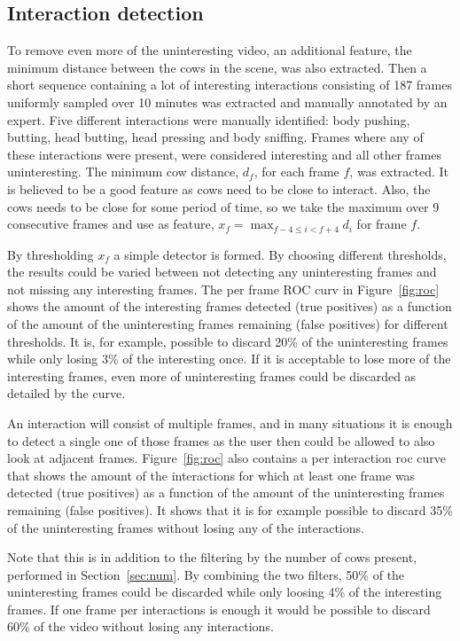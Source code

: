 \documentclass{cta-author}
\begin{document}
\subsection{Interaction detection}
To remove even more of the uninteresting video, an additional feature, the minimum distance between the cows
in the scene, was also extracted. Then a short sequence containing a lot of interesting interactions
consisting of 187 frames uniformly sampled over 10 minutes was extracted and manually annotated by an expert.
Five different interactions were manually identified: body pushing, butting, head butting, head pressing and
body sniffing. Frames where any of these interactions were present, were considered interesting and all other
frames uninteresting. The minimum cow distance, $d_f$, for each frame $f$, was extracted. It is believed to
be a good feature as cows need to be close to interact. Also, the cows needs to be close for some period of
time, so we take the maximum over 9 consecutive frames and use as feature,
$x_f = \max_{f-4 \leq i < f+4} d_i$ for frame $f$.

By thresholding $x_f$ a simple detector is formed. By choosing different thresholds, the results could be
varied between not detecting any uninteresting frames and not missing any interesting frames. The per frame
ROC curv in Figure~\ref{fig:roc} shows the amount of the interesting frames detected (true positives) as a
function of the amount of the uninteresting frames remaining (false positives) for different thresholds. It
is, for example, possible to discard 20\% of the uninteresting frames while only losing 3\% of the
interesting once. If it is acceptable to lose more of the interesting frames, even more of uninteresting
frames could be discarded as detailed by the curve.

An interaction will consist of multiple frames, and in many situations it is enough to detect a single one
of those frames as the user then could be allowed to also look at adjacent frames. Figure~\ref{fig:roc} also
contains a per interaction roc curve that shows the amount of the interactions for which at least one frame
was detected (true positives) as a function of the amount of the uninteresting frames remaining (false
positives). It shows that it is for example possible to discard 35\% of the uninteresting frames without
losing any of the interactions.

Note that this is in addition to the filtering by the number of cows present, performed in
Section~\ref{sec:num}. By combining the two filters, 50\% of the uninteresting frames could be discarded
while only loosing 4\% of the interesting frames. If one frame per interactions is enough it would be
possible to discard 60\% of the video without losing any interactions.
\end{document}
